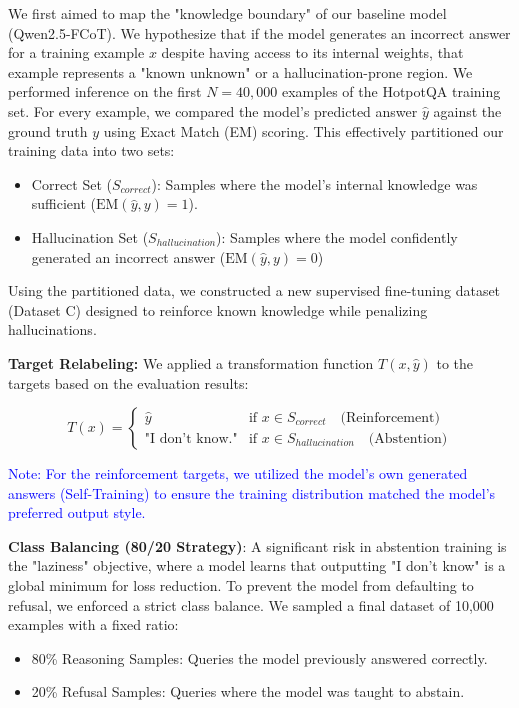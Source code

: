 \documentclass{article}
\newcommand{\note}[1]{\textcolor{blue}{{#1}}}
\begin{document}
We first aimed to map the "knowledge boundary" of our baseline model (Qwen2.5-FCoT). We hypothesize that if the model generates an incorrect answer for a training example $x$ despite having access to its internal weights, that example represents a "known unknown" or a hallucination-prone region. We performed inference on the first $N=40,000$ examples of the HotpotQA training set. For every example, we compared the model's predicted answer $\hat{y}$ against the ground truth $y$ using Exact Match (EM) scoring. This effectively partitioned our training data into two sets: 
\begin{itemize}
    \item Correct Set ($S_{correct}$): Samples where the model's internal knowledge was sufficient ($\text{EM}(\hat{y}, y) = 1$). 
    \item Hallucination Set ($S_{hallucination}$): Samples where the model confidently generated an incorrect answer ($\text{EM}(\hat{y}, y) = 0$)
\end{itemize}

Using the partitioned data, we constructed a new supervised fine-tuning dataset (Dataset C) designed to reinforce known knowledge while penalizing hallucinations.

\textbf{Target Relabeling:} We applied a transformation function $T(x, \hat{y})$ to the targets based on the evaluation results:

$$T(x) =
\begin{cases}
\hat{y} & \text{if } x \in S_{correct} \quad \text{(Reinforcement)} \\
\text{"I don't know."} & \text{if } x \in S_{hallucination} \quad \text{(Abstention)}
\end{cases}$$

\note{Note: For the reinforcement targets, we utilized the model's own generated answers (Self-Training) to ensure the training distribution matched the model's preferred output style.}

\textbf{Class Balancing (80/20 Strategy)}: A significant risk in abstention training is the "laziness" objective, where a model learns that outputting "I don't know" is a global minimum for loss reduction. To prevent the model from defaulting to refusal, we enforced a strict class balance. We sampled a final dataset of 10,000 examples with a fixed ratio:
\begin{itemize}
    \item 80\% Reasoning Samples: Queries the model previously answered correctly.
    \item 20\% Refusal Samples: Queries where the model was taught to abstain.
\end{itemize}
\end{document}
